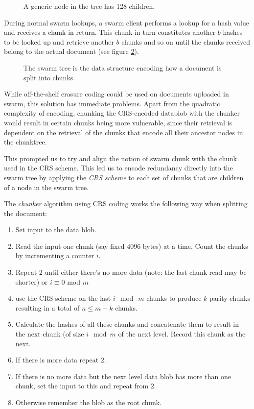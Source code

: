 \begin{figure}[htbp]
   \centering
   
   \caption{ A generic node in the tree has 128 children.}
   \label{fig:swarm-hash-basic}
\end{figure}

During normal swarm lookups, a swarm client performs a lookup for a hash value and receives a chunk in return. This chunk in turn constitutes another $b$ hashes to be looked up and retrieve another $b$ chunks and so on until the chunks received belong to the actual document (see figure \ref{fig:swarm-hash-split}).


\begin{figure}[htbp]
   \centering
   
   \caption{ The swarm tree is the data structure encoding how a document is split into chunks.}
   \label{fig:swarm-hash-split}
\end{figure}

While off-the-shelf erasure coding could be used on documents uploaded in swarm, this solution has immediate problems. Apart from the quadratic complexity of encoding, chunking the CRS-encoded datablob with the chunker would result in certain chunks being more vulnerable, since their retrieval is dependent on the retrieval of the chunks that encode all their ancestor nodes in the chunktree.

This prompted us to try and align the notion of swarm chunk with the chunk used in the CRS scheme. This led us to encode redundancy directly into the swarm tree by applying the \emph{CRS scheme}  to each set of chunks that are children of a node in the swarm tree.

The \emph{chunker} algorithm using CRS coding works the following way when splitting the document:

\begin{enumerate}
\item Set input to the data blob.
\item Read the input one chunk (say fixed 4096 bytes) at a time. Count the chunks by incrementing a counter $i$. 
\item Repeat 2 until either there's no more data (note: the last chunk read may be shorter) or $i \equiv 0$ mod $m$
\item use the CRS scheme on the last $i \mod\ m$ chunks to produce $k$ parity chunks resulting in a total of $n \leq m+k$ chunks.
\item Calculate the hashes of all these chunks and concatenate them to result in the next chunk (of size $i\mod m$ of the next level. Record this chunk as the next.
\item If there is more data repeat 2. 
\item If there is no more data but the next level data blob has more than one chunk, set the input to this and repeat from 2.
\item Otherwise remember the blob as the root chunk.
\end{enumerate}

